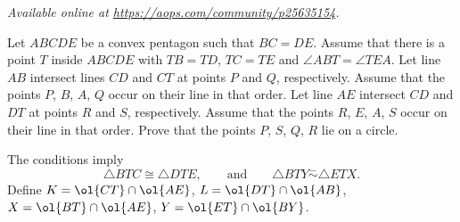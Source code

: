 \textsl{Available online at \url{https://aops.com/community/p25635154}.}
\begin{mdframed}[style=mdpurplebox,frametitle={Problem statement}]
Let $ABCDE$ be a convex pentagon such that $BC=DE$.
Assume that there is a point $T$ inside $ABCDE$
with $TB=TD$, $TC=TE$ and $\angle ABT = \angle TEA$.
Let line $AB$ intersect lines $CD$ and $CT$ at points $P$ and $Q$, respectively.
Assume that the points $P$, $B$, $A$, $Q$ occur on their line in that order.
Let line $AE$ intersect $CD$ and $DT$ at points $R$ and $S$, respectively.
Assume that the points $R$, $E$, $A$, $S$ occur on their line in that order.
Prove that the points $P$, $S$, $Q$, $R$ lie on a circle.
\end{mdframed}
The conditions imply
\[ \triangle BTC \cong \triangle DTE,
  \qquad\text{and}\qquad
  \triangle BTY \overset{-}{\sim} \triangle ETX. \]
Define $K = \ol{CT} \cap \ol{AE}$, $L = \ol{DT} \cap \ol{AB}$,
$X = \ol{BT} \cap \ol{AE}$, $Y = \ol{ET} \cap \ol{BY}$.

